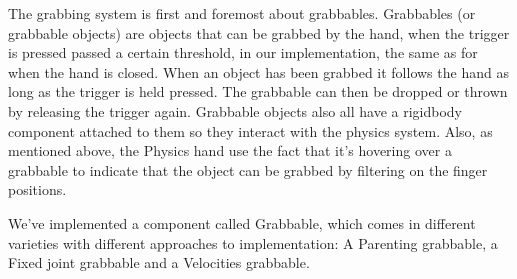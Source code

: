 
The grabbing system is first and foremost about grabbables. Grabbables (or grabbable objects) are objects that can be grabbed by the hand, when the trigger is pressed passed a certain threshold, in our implementation, the same as for when the hand is closed. When an object has been grabbed it follows the hand as long as the trigger is held pressed. The grabbable can then be dropped or thrown by releasing the trigger again. Grabbable objects also all have a rigidbody component attached to them so they interact with the physics system. Also, as mentioned above, the Physics hand use the fact that it's hovering over a grabbable to indicate that the object can be grabbed by filtering on the finger positions.

We've implemented a component called Grabbable, which comes in different varieties with different approaches to implementation: A Parenting grabbable, a Fixed joint grabbable and a Velocities grabbable.

